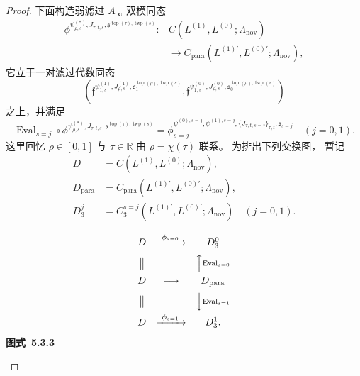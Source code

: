 \begin{proof}
下面构造弱滤过
$A_\infty$ 双模同态
\[
\begin{aligned}
\phi^{
\psi_{\rho,s}^{(*)},J_{\tau,t,s},
\mathfrak s^{\operatorname{top}(\tau),
\operatorname{twp}(s)}}\colon
&C(L^{(1)},L^{(0)};
\Lambda_{\mathrm{nov}})\\
&\longrightarrow
C_{\mathrm{para}}
(L^{(1)\prime},L^{(0)\prime};
\Lambda_{\mathrm{nov}}),
\end{aligned}
\]
它立于一对滤过代数同态
\[
\left(
\mathfrak f^{
\psi^{(1)}_{1,s},J^{(1)}_{\rho,s},
\mathfrak s^{\operatorname{top}(\rho),
\operatorname{twp}(s)}_1},
\mathfrak f^{
\psi^{(0)}_{1,s},J^{(0)}_{\rho,s},
\mathfrak s^{\operatorname{top}(\rho),
\operatorname{twp}(s)}_0}
\right)
\]
之上，并满足
\begin{equation}
\operatorname{Eval}_{s=j}
\circ
\phi^{
\psi_{\rho,s}^{(*)},J_{\tau,t,s},
\mathfrak s^{\operatorname{top}(\tau),
\operatorname{twp}(s)}}
=\phi_{s=j}^{
\psi^{(0),s=j},\psi^{(1),s=j},
\{J_{\tau,t,s=j}\}_{\tau,t},
\mathfrak s_{s=j}}
\quad(j=0,1).
\tag{5.3.37}\label{eq:5-3-37}
\end{equation}
这里回忆
$\rho\in[0,1]$ 与
$\tau\in\mathbb R$
由 $\rho=\chi(\tau)$ 联系。
为排出下列交换图，
暂记
\[
\begin{aligned}
D&=C(L^{(1)},L^{(0)};
\Lambda_{\mathrm{nov}}),\\
D_{\mathrm{para}}
&=C_{\mathrm{para}}
(L^{(1)\prime},L^{(0)\prime};
\Lambda_{\mathrm{nov}}),\\
D_3^j&=C_3^{s=j}
(L^{(1)\prime},L^{(0)\prime};
\Lambda_{\mathrm{nov}})
\quad(j=0,1).
\end{aligned}
\]
\begin{center}
\[
\begin{array}{ccc}
D&\xrightarrow{\ \phi_{s=0}\ }&D_3^0\\[2mm]
\big\Vert&&\Big\uparrow\vcenter{\hbox{\scriptsize
$\operatorname{Eval}_{s=0}$}}\\[2mm]
D&\longrightarrow&D_{\mathrm{para}}\\[2mm]
\big\Vert&&\Big\downarrow\vcenter{\hbox{\scriptsize
$\operatorname{Eval}_{s=1}$}}\\[2mm]
D&\xrightarrow{\ \phi_{s=1}\ }&D_3^1 .
\end{array}
\]
\renewcommand{\thefigure}{5.3.3}
{\normalfont\bfseries 图式~\thefigure}\label{diag:5-3-3}
\end{center}


\end{proof}
